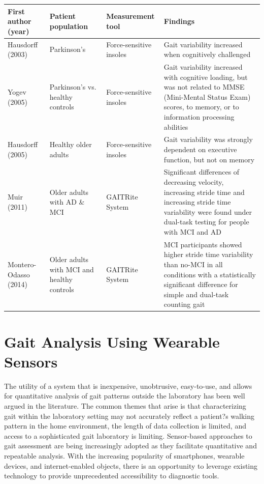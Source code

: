 \documentclass[11pt, oneside]{report}   	%
\begin{document}
\begin{table}

\begin{adjustbox}{max width=\textwidth}
  \begin{tabular}{| l | p{4cm} | p{4cm} | p{6cm} |}

    \hline
    \textbf{First author (year)} & \textbf{Patient population} & \textbf{Measurement tool} & \textbf{Findings} \\ \hline
    Hausdorff (2003) & Parkinson's & Force-sensitive insoles & Gait variability increased when cognitively challenged \\ \hline
    Yogev (2005) & Parkinson's vs. healthy controls & Force-sensitive insoles & Gait variability increased with cognitive loading, but was not related to MMSE (Mini-Mental Status Exam) scores, to memory, or to information processing abilities \\ \hline
    Hausdorff (2005) & Healthy older adults & Force-sensitive insoles & Gait variability was strongly dependent on executive function, but not on memory \\ \hline
    Muir (2011) & Older adults with AD \& MCI & GAITRite System & Significant differences of decreasing velocity, increasing stride time and increasing stride time variability were found under dual-task testing for people with MCI and AD \\ \hline
    Montero-Odasso (2014) & Older adults with MCI and healthy controls & GAITRite System & MCI participants showed higher stride time variability than no-MCI in all conditions with a statistically significant difference for simple and dual-task counting gait \\ 
    \hline
    
  \end{tabular}
\end{adjustbox}
\end{table}

\pagebreak

\chapter{Gait Analysis Using Wearable Sensors}

The utility of a system that is inexpensive, unobtrusive, easy-to-use, and allows for quantitative analysis of gait patterns outside the laboratory has been well argued in the literature\cite{Tao2012, SantAnna2009, Patel2012, Itoh2008, Malaric2010, Godfrey2015}. The common themes that arise is that characterizing gait within the laboratory setting may not accurately reflect a patient?s walking pattern in the home environment, the length of data collection is limited, and access to a sophisticated gait laboratory is limiting. Sensor-based approaches to gait assessment are being increasingly adopted as they facilitate quantitative and repeatable analysis\cite{Khusainov2013}. With the increasing popularity of smartphones, wearable devices, and internet-enabled objects, there is an opportunity to leverage existing technology to provide unprecedented accessibility to diagnostic tools.
\end{document}
